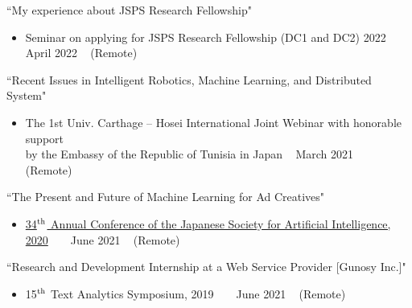 \begin{talks}
	\talk
	{``My experience about JSPS Research Fellowship"}
	{
	\begin{itemize}[leftmargin=.4in]
	    \item Seminar on applying for JSPS Research Fellowship (DC1 and DC2) 2022 ~ \lbrack\href{https://www.hosei.ac.jp/kenkyu/info/article-20220228215045/}{\small{\websiteSymbol}}\rbrack ~
	    \lbrack\href{https://speakerdeck.com/shunk031/jsps-dc-hosei-seminar-2023}{\small{\videoSymbol}}\rbrack
	    \hfill April 2022 ~ (Remote)
	\end{itemize}
	}
	
	\talk
	{``Recent Issues in Intelligent Robotics, Machine Learning, and Distributed System"}
	{
	\begin{itemize}[leftmargin=.4in]
	    \item The 1st Univ. Carthage – Hosei International Joint Webinar with honorable support \\ by the Embassy of the Republic of Tunisia in Japan ~ \lbrack\href{https://speakerdeck.com/shunk031/practical-and-interpretable-deep-learning-techniques-in-our-iyatomis-lab}{\small{\videoSymbol}}\rbrack
	    \hfill March 2021 ~ (Remote)
	\end{itemize}
	}

	\talk
	{``The Present and Future of Machine Learning for Ad Creatives"}
	{
	\begin{itemize}[leftmargin=.4in]
	    \item \href{https://confit.atlas.jp/guide/event/jsai2020/subject/1H3-OS-12a-05/tables?cryptoId=}{34$^{\textrm{\scriptsize th}}$ Annual Conference of the Japanese Society for Artificial Intelligence, 2020} ~ \lbrack\href{https://pydata.org/nyc2018/schedule/presentation/14/}{\small{\websiteSymbol}}\rbrack ~
	    \lbrack\href{https://speakerdeck.com/shunk031/the-present-and-future-of-machine-learning-for-ad-creatives}{\small{\videoSymbol}}\rbrack
	    \hfill June 2021 ~ (Remote)
	\end{itemize}
	}

	\talk
	{``Research and Development Internship at a Web Service Provider [Gunosy Inc.]"}
	{
	\begin{itemize}[leftmargin=.4in]
	    \item 15$^{\textrm{\scriptsize th}}$ Text Analytics Symposium, 2019 ~ \lbrack\href{http://www.ieice.org/~nlc/tm15a.html}{\small{\websiteSymbol}}\rbrack ~
	    \lbrack\href{https://speakerdeck.com/ysekky/research-intern-case-study-at-gunosy}{\small{\videoSymbol}}\rbrack
	    \hfill June 2021 ~ (Remote)
	\end{itemize}
	}


\end{talks}
